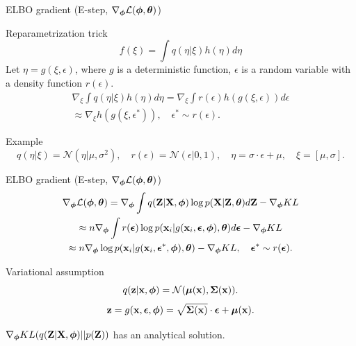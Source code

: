 \begin{frame}{ELBO gradient (E-step, $\nabla_{\boldsymbol{\phi}} \mathcal{L}(\boldsymbol{\phi}, \boldsymbol{\theta})$)}
\begin{block}{Reparametrization trick}
\vspace{-0.3cm}
\[
	f(\xi) = \int q(\eta|\xi) h(\eta) d\eta
\]
Let $\eta = g(\xi, \epsilon)$, where $g$ is a deterministic function, $\epsilon$ is a random variable with a density function $r(\epsilon)$.
\begin{multline*}
\nabla_\xi \int q(\eta|\xi) h(\eta) d\eta = \nabla_\xi \int r(\epsilon) h(g(\xi, \epsilon)) d \epsilon \\
\approx \nabla_\xi h(g(\xi, \epsilon^*)), \quad \epsilon^* \sim r(\epsilon).
\end{multline*}
\end{block}
\vspace{-0.1cm}
\begin{block}{Example}
\vspace{-0.3cm}
\[
	q(\eta|\xi) = \mathcal{N}(\eta| \mu, \sigma^2), \quad r(\epsilon) = \mathcal{N}(\epsilon|0, 1), \quad \eta = \sigma \cdot \epsilon + \mu, \quad \xi = [\mu, \sigma].
\]
\end{block}
\end{frame}
\begin{frame}{ELBO gradient (E-step, $\nabla_{\boldsymbol{\phi}} \mathcal{L}(\boldsymbol{\phi}, \boldsymbol{\theta})$)}
	\vspace{-0.3cm}
	\begin{multline*}
		\nabla_{\boldsymbol{\phi}} \mathcal{L} (\boldsymbol{\phi}, \boldsymbol{\theta}) = \nabla_{\boldsymbol{\phi}}\int q(\mathbf{Z}|\mathbf{X}, \boldsymbol{\phi}) \log p(\mathbf{X}| \mathbf{Z}, \boldsymbol{\theta})d\mathbf{Z}  - \nabla_{\boldsymbol{\phi}} KL \\ \approx  n \nabla_{\boldsymbol{\phi}}\int r(\boldsymbol{\epsilon}) \log p(\mathbf{x}_i| g(\mathbf{x}_i, \boldsymbol{\epsilon}, \boldsymbol{\phi}), \boldsymbol{\theta})d\boldsymbol{\epsilon}  - \nabla_{\boldsymbol{\phi}} KL  \\ \approx
		n \nabla_{\boldsymbol{\phi}} \log p(\mathbf{x}_i| g(\mathbf{x}_i, \boldsymbol{\epsilon}^*, \boldsymbol{\phi}), \boldsymbol{\theta})  - \nabla_{\boldsymbol{\phi}} KL , \quad \boldsymbol{\epsilon}^* \sim r(\boldsymbol{\epsilon}).
	\end{multline*}
	
	\begin{block}{Variational assumption}
	\[
	q(\mathbf{z}| \mathbf{x}, \boldsymbol{\phi}) = \mathcal{N} (\boldsymbol{\mu}(\mathbf{x}), \boldsymbol{\Sigma}(\mathbf{x})).
	\]
	\[
		\mathbf{z} = g(\mathbf{x}, \boldsymbol{\epsilon}, \boldsymbol{\phi}) = \sqrt{\boldsymbol{\Sigma}(\mathbf{x})} \cdot \boldsymbol{\epsilon} + \boldsymbol{\mu}(\mathbf{x}).
	\]
	\end{block}
	$\nabla_{\boldsymbol{\phi}} KL (q(\mathbf{Z} | \mathbf{X}, \boldsymbol{\phi}) || p(\mathbf{Z}))$ has an analytical solution.
\end{frame}
